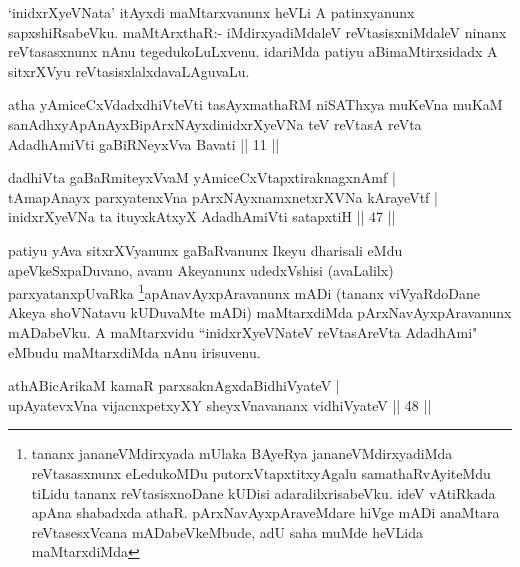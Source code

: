 \begin{artha}
`inidxrXyeVNata' itAyxdi maMtarxvanunx heVLi A patinxyanunx sapxshiRsabeVku. 
 maMtArxthaR:- iMdirxyadiMdaleV reVtasisxniMdaleV ninanx reVtasasxnunx 
nAnu tegedukoLuLxvenu. idariMda patiyu aBimaMtirxsidadx A sitxrXVyu 
reVtasisxlalxdavaLAguvaLu.
\end{artha}

\begin{kandikeshl}
atha yAmiceCxVdadxdhiVteVti tasAyxmathaRM niSAThxya muKeVna muKaM sanAdhxyApAnAyxBipArxNAyxdinidxrXyeVNa teV reVtasA reVta AdadhAmiVti gaBiRNeyxVva Bavati || 11 ||
\end{kandikeshl}


\begin{shl}
dadhiVta gaBaRmiteyxVvaM yAmiceCxVtapxtiraknagxnAmf | \\
tAmapAnayx parxyatenxVna pArxNAyxnamxnetxrXVNa kArayeVtf | \\
inidxrXyeVNa ta ituyxkAtxyX AdadhAmiVti satapxtiH \hfill|| 47 || 
\end{shl}

\begin{artha}
patiyu yAva sitxrXVyanunx gaBaRvanunx Ikeyu dharisali eMdu 
apeVkeSxpaDuvano, avanu Akeyanunx udedxVshisi (avaLalilx) 
parxyatanxpUvaRka \footnote{tananx jananeVMdirxyada mUlaka BAyeRya 
jananeVMdirxyadiMda reVtasasxnunx eLedukoMDu putorxVtapxtitxyAgalu 
samathaRvAyiteMdu tiLidu tananx reVtasisxnoDane kUDisi 
adaralilxrisabeVku. ideV vAtiRkada apAna shabadxda athaR. 
pArxNavAyxpAraveMdare hiVge mADi anaMtara reVtasesxVcana 
mADabeVkeMbude, adU saha muMde heVLida maMtarxdiMda}apAnavAyxpAravanunx mADi (tananx 
viVyaRdoDane Akeya shoVNatavu kUDuvaMte mADi) maMtarxdiMda 
pArxNavAyxpAravanunx mADabeVku. A maMtarxvidu ``inidxrXyeVNateV reVtasAreVta AdadhAmi" eMbudu 
maMtarxdiMda nAnu irisuvenu.
\end{artha}


\begin{shl}
athA\s \s BicArikaM kamaR parxsaknAgxdaBidhiVyateV | \\
upAyatevxVna vijacnxpetxyXY sheyxVnavananx vidhiVyateV \hfill|| 48 || 
\end{shl}

